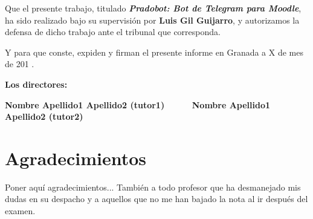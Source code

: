 Que el presente trabajo, titulado \textit{\textbf{Pradobot: Bot de Telegram para Moodle}},
ha sido realizado bajo su supervisión por \textbf{Luis Gil Guijarro}, y autorizamos la defensa de dicho trabajo ante el tribunal
que corresponda.

\vspace{0.5cm}

Y para que conste, expiden y firman el presente informe en Granada a X de mes de 201 .

\vspace{1cm}

\textbf{Los directores:}

\vspace{5cm}

\noindent \textbf{Nombre Apellido1 Apellido2 (tutor1) \ \ \ \ \ Nombre Apellido1 Apellido2 (tutor2)}

\chapter*{Agradecimientos}
\thispagestyle{empty}

       \vspace{1cm}


Poner aquí agradecimientos...
También a todo profesor que ha desmanejado mis dudas en su despacho y a aquellos que no me han bajado la nota al ir después del examen.


